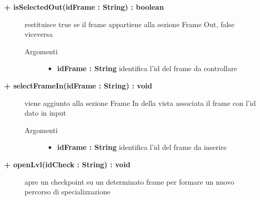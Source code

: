 \begin{description}
\begin{description}
\begin{description}
\begin{itemize}
				\end{itemize}
		\end{description}
	\end{description}

	\begin{description}
		\item[\textbf{\color{blue}+ isSelectedOut(idFrame : String) : boolean			}] \hfill
			restituisce true se il frame appartiene alla sezione Frame Out, false viceversa
			
		\begin{description}
			\item[Argomenti] \hfill
				\begin{itemize}
				
					\item \textbf{idFrame : String			} \hfill
						identifica l'id del frame da controllare
					
				\end{itemize}
		\end{description}
	\end{description}
	
	\begin{description}
		\item[\textbf{\color{blue}+ selectFrameIn(idFrame : String) : void			}] \hfill
			viene aggiunto alla sezione Frame In della vista associata il frame con l'id dato in input
			
		\begin{description}
			\item[Argomenti] \hfill
				\begin{itemize}
				
					\item \textbf{idFrame : String			} \hfill
						identifica l'id del frame da inserire
					
				\end{itemize}
		\end{description}
	\end{description}
	
	\begin{description}
		\item[\textbf{\color{blue}+ openLvl(idCheck : String) : void			}] \hfill
			apre un checkpoint su un determinato frame per formare un nuovo percorso di specializzazione
			

\end{description}
\end{description}
